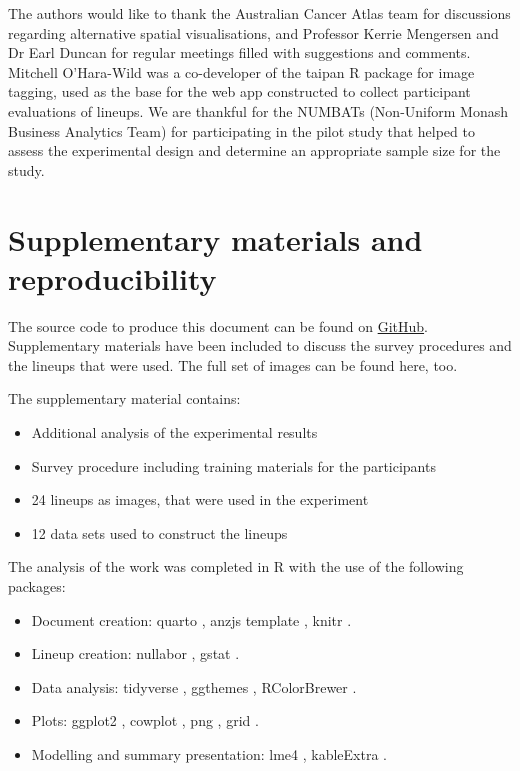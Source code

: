 \documentclass[
doublespace,
  times]{anzsauth}
\providecommand{\tightlist}{%
  \setlength{\itemsep}{0pt}\setlength{\parskip}{0pt}}
\begin{document}
The authors would like to thank the Australian Cancer Atlas team for
discussions regarding alternative spatial visualisations, and Professor
Kerrie Mengersen and Dr Earl Duncan for regular meetings filled with
suggestions and comments. Mitchell O'Hara-Wild was a co-developer of the
taipan \citep{taipan} R package for image tagging, used as the base for
the web app constructed to collect participant evaluations of lineups.
We are thankful for the NUMBATs (Non-Uniform Monash Business Analytics
Team) for participating in the pilot study that helped to assess the
experimental design and determine an appropriate sample size for the
study.

\section*{Supplementary materials and
reproducibility}\label{supplementary-materials-and-reproducibility}

The source code to produce this document can be found on
\href{https://github.com/srkobakian/experiment/paper}{GitHub}.
Supplementary materials have been included to discuss the survey
procedures and the lineups that were used. The full set of images can be
found here, too.

The supplementary material contains:

\begin{itemize}
\tightlist
\item
  Additional analysis of the experimental results
\item
  Survey procedure including training materials for the participants
\item
  24 lineups as images, that were used in the experiment
\item
  12 data sets used to construct the lineups
\end{itemize}

The analysis of the work was completed in R \citep{RCore} with the use
of the following packages:

\begin{itemize}
\tightlist
\item
  Document creation: quarto \citep{Allaire_Quarto_2025}, anzjs template
  \citep{quarto-anzjs}, knitr \citep{knitr}.
\item
  Lineup creation: nullabor \citep{nullabor}, gstat \citep{gstat}.
\item
  Data analysis: tidyverse \citep{tidyverse}, ggthemes \citep{ggthemes},
  RColorBrewer \citep{RColorBrewer}.
\item
  Plots: ggplot2 \citep{ggplot2}, cowplot \citep{cowplot}, png
  \citep{png}, grid \citep{grid}.
\item
  Modelling and summary presentation: lme4 \citep{lme4}, kableExtra
  \citep{kableExtra}.
\end{itemize}
\end{document}
